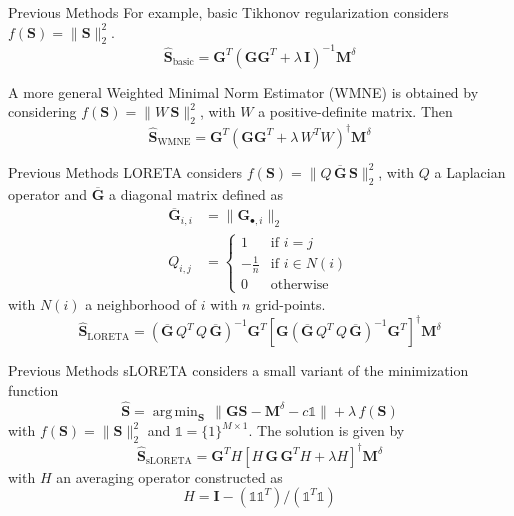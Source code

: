 \documentclass[progressbar=head]{beamer}
\newcommand{\ppar}[1]{ \left( #1 \right) }
\newcommand{\spar}[1]{ \left[ #1 \right] }
\DeclareMathOperator*{\argmin}{arg\,min}
\newcommand{\nnorm}[1]{\lVert #1 \rVert}
\newcommand{\G}{\mathbf{G}}
\newcommand{\id}{\mathbf{I}}
\begin{document}
\begin{frame}{Previous Methods}
    For example, basic Tikhonov regularization considers $f\ppar{\mathbf{S}} = \nnorm{\mathbf{S}}_2^2$.
\begin{equation}
    \hat{\mathbf{S}}_{\text{basic}}
    =
    \G^T \ppar{\G \G^T + \lambda\, \id}^{-1} \mathbf{M}^\delta
\end{equation}

A more general Weighted Minimal Norm Estimator (WMNE) is obtained by considering
$f\ppar{\mathbf{S}} = \nnorm{W\, \mathbf{S}}_2^2$, with $W$ a positive-definite matrix. Then
\begin{equation}
    \hat{\mathbf{S}}_{\text{WMNE}}
    =
    \G^T \ppar{\G \G^T + \lambda\, W^T W}^{\dagger} \mathbf{M}^\delta
\end{equation}
\end{frame}

\begin{frame}{Previous Methods}
LORETA\cite{loreta}  considers 
$f\ppar{\mathbf{S}} = \nnorm{Q\,\overline{\G}\, \mathbf{S}}_2^2$, with $Q$ 
a Laplacian operator and $\overline{\G}$ 
a diagonal matrix
defined as
\begin{align*}
    \overline{\G}_{i,i} &= \nnorm{\G_{\bullet,i}}_2 \\
    Q_{i,j} &=
    \begin{cases}
        1 &\text{if } i=j \\
        -\frac{1}{n} &\text{if } i\in N(i) \\
        0 &\text{otherwise}
    \end{cases}
\end{align*}
with $N(i)$ a neighborhood of $i$ with $n$ grid-points.
%
\begin{equation}
    \hat{\mathbf{S}}_{\text{LORETA}}
    =
    \ppar{\overline{\G}\, Q^T\, Q\,  \overline{\G}}^{-1} \G^T
    \spar{\G \ppar{\overline{\G}\, Q^T\, Q\,  \overline{\G}}^{-1} \G^T}^{\dagger} 
    \mathbf{M}^\delta
\end{equation}
\end{frame}

\begin{frame}{Previous Methods}
sLORETA\cite{sloreta}  considers a small variant of the minimization function
\begin{equation}
    \hat{\mathbf{S}} = \argmin_{\mathbf{S}}\, \nnorm{\G \mathbf{S}-\mathbf{M}^\delta-c \mathbb{1}} + \lambda\, f\ppar{\mathbf{S}}
\end{equation}
with $f\ppar{\mathbf{S}} = \nnorm{\mathbf{S}}_2^2$ and 
$\mathbb{1}=\{1\}^{M\times 1}$.
The solution is given by
\begin{equation}
    \hat{\mathbf{S}}_{\text{sLORETA}}
    =
    \G^T H\spar{H\, \G\, \G^T H+ \lambda H}^{\dagger}
    \mathbf{M}^\delta
\end{equation}
with $H$ an averaging operator constructed as
\begin{equation*}
    H = \id - \ppar{\mathbb{1} \mathbb{1}^T}/\ppar{\mathbb{1}^T \mathbb{1}}
\end{equation*}

\end{frame}
\end{document}
